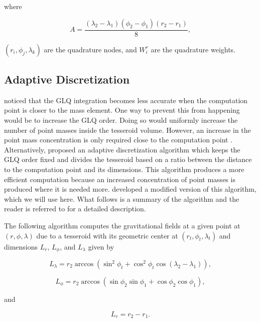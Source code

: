 \documentclass[extra]{gji}
\begin{document}
\noindent where

\begin{equation}
    A =
    \frac{(\lambda_2 - \lambda_1)(\phi_2 - \phi_1)(r_2 - r_1)}{8},
\end{equation}

\noindent $(r_i, \phi_j, \lambda_k)$ are the quadrature nodes, and $W_i^r$ are the
quadrature weights.


\subsection{Adaptive Discretization}

\citet{Ku1977} noticed that the GLQ integration
becomes less accurate when the computation point is closer to the
mass element.
One way to prevent this from happening would be to increase the GLQ order.
Doing so would uniformly increase the number of point masses inside the
tesseroid volume.
However, an increase in the point mass concentration is only required close to the
computation point \citep{Uieda2016}.
Alternatively, \citet{Li2011} proposed an adaptive
discretization algorithm which keeps the GLQ order fixed and divides the
tesseroid based on a ratio between the distance to the computation
point and its dimensions.
This algorithm produces a more efficient computation because an increased concentration
of point masses is produced where it is needed more.
\citet{Uieda2016} developed a modified version of this algorithm, which we will use
here.
What follows is a summary of the algorithm and the reader is referred to
\citet{Uieda2016} for a detailed description.

The following algorithm computes the gravitational fields at a given point at $(r, \phi,
\lambda)$ due to a tesseroid with its geometric center at $(r_t, \phi_t, \lambda_t)$ and
dimensions $L_r$, $L_\phi$, and $L_\lambda$ given by

\begin{equation}
    L_\lambda = r_2 \arccos(\sin^2\phi_t +
        \cos^2\phi_t\cos(\lambda_2 - \lambda_1)),
    \label{eq:sizelon}
\end{equation}

\begin{equation}
    L_\phi = r_2 \arccos(\sin\phi_2\sin\phi_1 + \cos\phi_2\cos\phi_1),
\end{equation}

and

\begin{equation}
    L_r = r_2 - r_1.
    \label{eq:sizer}
\end{equation}
\end{document}
